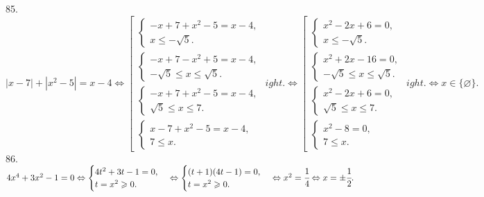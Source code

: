 85. $|x-7|+|x^2-5|=x-4\Leftrightarrow \left[\begin{array}{l}\begin{cases} -x+7+x^2-5=x-4,\\ x\leqslant -\sqrt{5}.\end{cases}\\
\begin{cases} -x+7-x^2+5=x-4,\\ -\sqrt{5}\leqslant x\leqslant \sqrt{5}.\end{cases}\\ \begin{cases} -x+7+x^2-5=x-4,\\ \sqrt{5}\leqslant x\leqslant7.\end{cases}\\
\begin{cases} x-7+x^2-5=x-4,\\ 7 \leqslant x.\end{cases}
\end{array}
ight.\Leftrightarrow
\left[\begin{array}{l}\begin{cases} x^2-2x+6=0,\\ x\leqslant -\sqrt{5}.\end{cases}\\
\begin{cases} x^2+2x-16=0,\\ -\sqrt{5}\leqslant x\leqslant \sqrt{5}.\end{cases}\\ \begin{cases} x^2-2x+6=0,\\ \sqrt{5}\leqslant x\leqslant7.\end{cases}\\
\begin{cases} x^2-8=0,\\ 7 \leqslant x.\end{cases}
\end{array}
ight.\Leftrightarrow x\in\{\varnothing\}.$\\
86. $4x^4+3x^2-1=0\Leftrightarrow\begin{cases}4t^2+3t-1=0,\\ t=x^2\geqslant0.\end{cases}\Leftrightarrow\begin{cases}(t+1)(4t-1)=0,\\ t=x^2\geqslant0.\end{cases}
\Leftrightarrow x^2=\cfrac{1}{4} \Leftrightarrow x=\pm\cfrac{1}{2}.$\\
